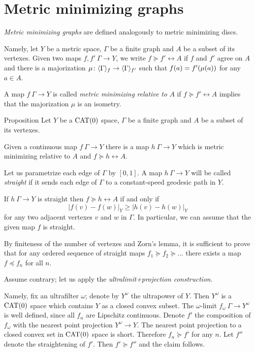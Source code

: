 \section{Metric minimizing graphs}\label{Metric minimizing graphs}

\emph{Metric minimizing graphs} are defined analogously to metric minimizing discs.

Namely, let $Y$ be a metric space, $\Gamma$ be a finite graph and $A$ be a subset of its vertexes.
Given two maps $f,f'\:\Gamma\to Y$, we write $f\succcurlyeq f'\rel A$ if $f$ and $f'$ agree on $A$ 
and there is a majorization $\mu\colon\langle\Gamma\rangle_f\to \langle\Gamma\rangle_{f'}$
such that $f(a)\zz=f'(\mu(a))$ for any $a\in A$.

A map $f\:\Gamma\to Y$ is called \emph{metric minimizing relative to $A$} if $f\succcurlyeq f'\rel A$ implies that the majorization $\mu$ is an isometry.

\begin{thm}{Proposition}\label{prop:metric-min-graph-exist}
Let $Y$ be a $\mathop{\rm CAT}\nolimits(0)$ space, 
$\Gamma$ be a finite graph and $A$ be a subset of its vertexes.

Given a continuous map $f\:\Gamma\to Y$ there is a map $h\:\Gamma\to Y$ 
which is metric minimizing relative to $A$ and $f\succcurlyeq h\rel A$.
\end{thm}

Let us parametrize each edge of $\Gamma$ by $[0,1]$.
A map $h\:\Gamma\to Y$ will be called \emph{straight} if it
sends each edge of $\Gamma$ to a constant-speed geodesic path in $Y$.

If $h\:\Gamma\to Y$ is straight then $f\succcurlyeq h\rel A$ if and only if 
\[|f(v)-f(w)|_Y\ge |h(v)-h(w)|_Y\]
for any two adjacent vertexes $v$ and $w$ in $\Gamma$.
In particular, we can assume that the given map $f$ is straight.

By finiteness of the number of vertexes and Zorn's lemma,
it is sufficient to prove that for any ordered sequence of straight maps $f_1\succcurlyeq f_2\succcurlyeq \dots$ there exists a map $f\preccurlyeq f_n$ for all $n$.

Assume contrary; let us apply the \emph{ultralimit+projection construction}.

Namely, fix an ultrafilter $\omega$; denote by $Y^\omega$ the ultrapower of $Y$. 
Then $Y^\omega$
is a $\mathop{\rm CAT}\nolimits(0)$ space which contains $Y$ as a closed convex subset. 
The $\omega$-limit $f_\omega\:\Gamma\to Y^\omega$ is well defined, since all $f_n$ are Lipschitz continuous. 
Denote $f'$ the composition of $f_\omega$ with the nearest point projection $Y^\omega\to Y$.
The nearest point projection to a closed convex set in $\mathop{\rm CAT}\nolimits(0)$ space is short.
Therefore $f_n\succcurlyeq f'$ for any $n$.
Let $f''$ denote the straightening of $f'$.
Then $f'\succcurlyeq f''$ and the claim follows.
\qeds



